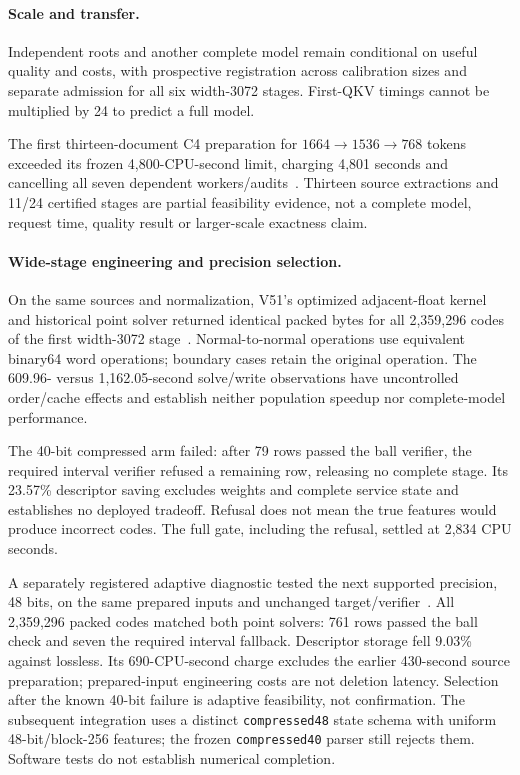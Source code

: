 \documentclass[10pt,twocolumn,letterpaper]{article}
\begin{document}
\paragraph{Scale and transfer.}
Independent roots and another complete model remain conditional on useful
quality and costs, with prospective registration across calibration sizes and
separate admission for all six width-3072 stages. First-QKV timings cannot be
multiplied by 24 to predict a full model.

The first thirteen-document C4 preparation for $1664\to1536\to768$ tokens
exceeded its frozen 4,800-CPU-second limit, charging 4,801 seconds and cancelling
all seven dependent workers/audits~\cite{v49failure}. Thirteen source extractions
and 11/24 certified stages are partial feasibility evidence, not a complete
model, request time, quality result or larger-scale exactness claim.

\paragraph{Wide-stage engineering and precision selection.}
On the same sources and normalization, V51's optimized adjacent-float kernel
and historical point solver returned identical packed bytes for all 2,359,296
codes of the first width-3072 stage~\cite{v51}. Normal-to-normal operations use
equivalent binary64 word operations; boundary cases retain the original operation.
The 609.96- versus 1,162.05-second solve/write observations have uncontrolled
order/cache effects and establish neither population speedup nor complete-model
performance.

The 40-bit compressed arm failed: after 79 rows passed the ball verifier, the
required interval verifier refused a remaining row, releasing no complete stage.
Its 23.57\% descriptor saving excludes weights and complete service state and
establishes no deployed tradeoff. Refusal does not mean the true features would
produce incorrect codes. The full gate, including the refusal, settled at 2,834
CPU seconds.

A separately registered adaptive diagnostic tested the next supported precision,
48 bits, on the same prepared inputs and unchanged target/verifier~\cite{v52}.
All 2,359,296 packed codes matched both point solvers: 761 rows passed the ball
check and seven the required interval fallback. Descriptor storage fell 9.03\%
against lossless. Its 690-CPU-second charge excludes the earlier 430-second source
preparation; prepared-input engineering costs are not deletion latency. Selection
after the known 40-bit failure is adaptive feasibility, not confirmation.
The subsequent integration uses a distinct \texttt{compressed48} state schema
with uniform 48-bit/block-256 features; the frozen \texttt{compressed40} parser
still rejects them. Software tests do not establish numerical completion.
\end{document}
